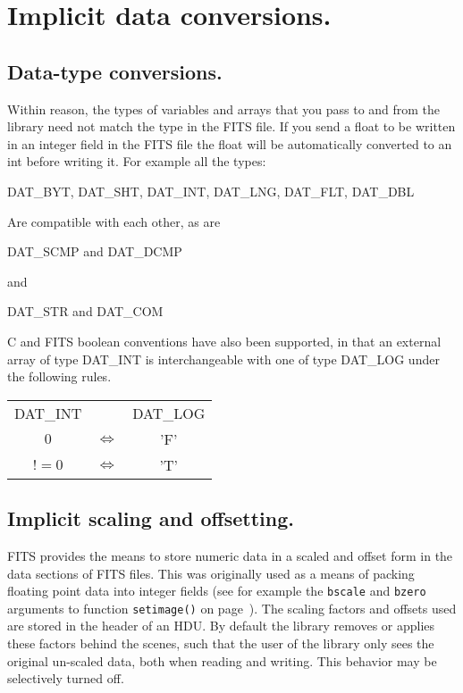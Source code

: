 \section{Implicit data conversions.}

\label{data_conv}\subsection{Data-type conversions.}

Within reason, the types of variables and arrays that you pass to and
from the library need not match the type in the FITS file.
If you send a float to be written in an integer field in the FITS file
the float will be automatically converted to an int before writing it.
For example all the types:

\hspace{3mm} DAT\_BYT, DAT\_SHT, DAT\_INT, DAT\_LNG, DAT\_FLT, DAT\_DBL

Are compatible with each other, as are

\hspace{3mm} DAT\_SCMP and DAT\_DCMP

and

\hspace{3mm} DAT\_STR and DAT\_COM

C and FITS boolean conventions have also been supported, in that
an external array of type DAT\_INT is interchangeable with one of
type DAT\_LOG under the following rules.

\begin{tabular}{ccc}
 DAT\_INT & & DAT\_LOG \\
 \cline{1-1} \cline{3-3}
 $0$   & $\Leftrightarrow$ & 'F' \\
 $!=0$ & $\Leftrightarrow$ & 'T' \\
\end{tabular}

\subsection{Implicit scaling and offsetting.}

FITS provides the means to store numeric data in a scaled and offset
form in the data sections of FITS files. This was originally used as a
means of packing floating point data into integer fields (see for
example the \verb`bscale` and \verb`bzero` arguments to function
\verb`setimage()` on page~\pageref{setimage}). The scaling factors and
offsets used are stored in the header of an HDU. By default the
library removes or applies these factors behind the scenes, such that
the user of the library only sees the original un-scaled data, both
when reading and writing. This behavior may be selectively turned off.

